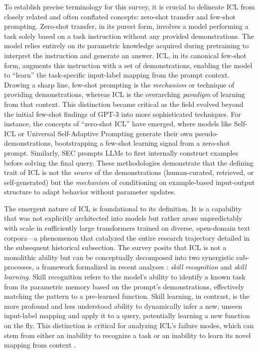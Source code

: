 \documentclass[11pt]{article}
\begin{document}
To establish precise terminology for this survey, it is crucial to delineate ICL from closely related and often conflated concepts: zero-shot transfer and few-shot prompting. Zero-shot transfer, in its purest form, involves a model performing a task solely based on a task instruction without any provided demonstrations. The model relies entirely on its parametric knowledge acquired during pretraining to interpret the instruction and generate an answer. ICL, in its canonical few-shot form, augments this instruction with a set of demonstrations, enabling the model to ``learn'' the task-specific input-label mapping from the prompt context. Drawing a sharp line, few-shot prompting is the \emph{mechanism} or technique of providing demonstrations, whereas ICL is the overarching \emph{paradigm} of learning from that context. This distinction became critical as the field evolved beyond the initial few-shot findings of GPT-3 into more sophisticated techniques. For instance, the concepts of ``zero-shot ICL'' have emerged, where models like Self-ICL \cite{ref3} or Universal Self-Adaptive Prompting \cite{ref4} generate their own pseudo-demonstrations, bootstrapping a few-shot learning signal from a zero-shot prompt. Similarly, SEC \cite{ref5} prompts LLMs to first internally construct examples before solving the final query. These methodologies demonstrate that the defining trait of ICL is not the \emph{source} of the demonstrations (human-curated, retrieved, or self-generated) but the \emph{mechanism} of conditioning on example-based input-output structure to adapt behavior without parameter updates.

The emergent nature of ICL is foundational to its definition. It is a capability that was not explicitly architected into models but rather arose unpredictably with scale in sufficiently large transformers trained on diverse, open-domain text corpora---a phenomenon that catalyzed the entire research trajectory detailed in the subsequent historical subsection. The survey posits that ICL is not a monolithic ability but can be conceptually decomposed into two synergistic sub-processes, a framework formalized in recent analyses \cite{ref6}: \emph{skill recognition} and \emph{skill learning}. Skill recognition refers to the model's ability to identify a known task from its parametric memory based on the prompt's demonstrations, effectively matching the pattern to a pre-learned function. Skill learning, in contrast, is the more profound and less understood ability to dynamically infer a new, unseen input-label mapping and apply it to a query, potentially learning a new function on the fly. This distinction is critical for analyzing ICL's failure modes, which can stem from either an inability to recognize a task or an inability to learn its novel mapping from context \cite{ref7}.
\end{document}
